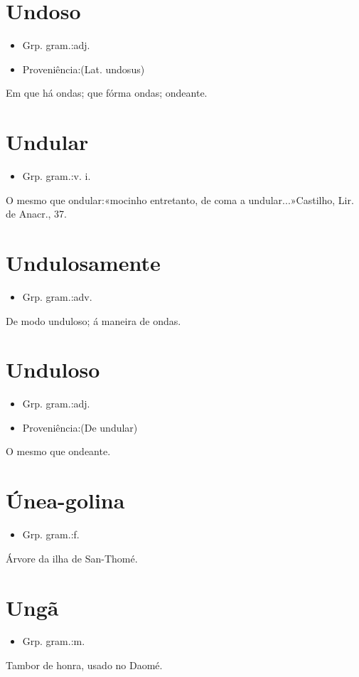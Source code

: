 \documentclass{article}
\begin{document}
\section{Undoso}
\begin{itemize}
\item {Grp. gram.:adj.}
\end{itemize}
\begin{itemize}
\item {Proveniência:(Lat. \textunderscore undosus\textunderscore )}
\end{itemize}
Em que há ondas; que fórma ondas; ondeante.
\section{Undular}
\begin{itemize}
\item {Grp. gram.:v. i.}
\end{itemize}
O mesmo que \textunderscore ondular\textunderscore :«\textunderscore mocinho entretanto, de coma a undular...\textunderscore »Castilho, \textunderscore Lir. de Anacr.\textunderscore , 37.
\section{Undulosamente}
\begin{itemize}
\item {Grp. gram.:adv.}
\end{itemize}
De modo unduloso; á maneira de ondas.
\section{Unduloso}
\begin{itemize}
\item {Grp. gram.:adj.}
\end{itemize}
\begin{itemize}
\item {Proveniência:(De \textunderscore undular\textunderscore )}
\end{itemize}
O mesmo que \textunderscore ondeante\textunderscore .
\section{Únea-golina}
\begin{itemize}
\item {Grp. gram.:f.}
\end{itemize}
Árvore da ilha de San-Thomé.
\section{Ungã}
\begin{itemize}
\item {Grp. gram.:m.}
\end{itemize}
Tambor de honra, usado no Daomé.
\end{document}
